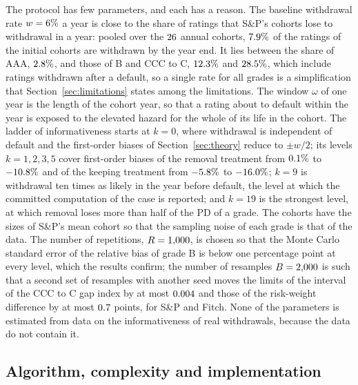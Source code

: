 The protocol has few parameters, and each has a reason. The baseline withdrawal rate $w=6\%$ a year is close to the share of ratings that S\&P's cohorts lose to withdrawal in a year: pooled over the $26$ annual cohorts, $7.9\%$ of the ratings of the initial cohorts are withdrawn by the year end. It lies between the share of AAA, $2.8\%$, and those of B and CCC to C, $12.3\%$ and $28.5\%$, which include ratings withdrawn after a default, so a single rate for all grades is a simplification that Section~\ref{sec:limitations} states among the limitations. The window $\omega$ of one year is the length of the cohort year, so that a rating about to default within the year is exposed to the elevated hazard for the whole of its life in the cohort. The ladder of informativeness starts at $k=0$, where withdrawal is independent of default and the first-order biases of Section~\ref{sec:theory} reduce to $\pm w/2$; its levels $k=1,2,3,5$ cover first-order biases of the removal treatment from $0.1\%$ to $-10.8\%$ and of the keeping treatment from $-5.8\%$ to $-16.0\%$; $k=9$ is withdrawal ten times as likely in the year before default, the level at which the committed computation of the case is reported; and $k=19$ is the strongest level, at which removal loses more than half of the PD of a grade. The cohorts have the sizes of S\&P's mean cohort so that the sampling noise of each grade is that of the data. The number of repetitions, $R=1{,}000$, is chosen so that the Monte Carlo standard error of the relative bias of grade B is below one percentage point at every level, which the results confirm; the number of resamples $B=2{,}000$ is such that a second set of resamples with another seed moves the limits of the interval of the CCC to C gap index by at most $0.004$ and those of the risk-weight difference by at most $0.7$ points, for S\&P and Fitch. None of the parameters is estimated from data on the informativeness of real withdrawals, because the data do not contain it. %

\subsection{Algorithm, complexity and implementation}
\label{sec:method-algorithm}

